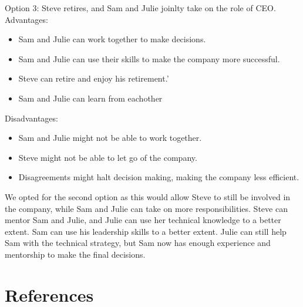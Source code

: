 \documentclass[a4paper,10pt]{article}
\begin{document}
Option 3: Steve retires, and Sam and Julie joinlty take on the role of CEO.\\

Advantages:\\
\begin{itemize}
    \item Sam and Julie can work together to make decisions.
    \item Sam and Julie can use their skills to make the company more successful.
    \item Steve can retire and enjoy his retirement.'
    \item Sam and Julie can learn from eachother
\end{itemize}

Disadvantages:\\
\begin{itemize}
    \item Sam and Julie might not be able to work together.
    \item Steve might not be able to let go of the company.
    \item Disagreements might halt decision making, making the company less efficient.
\end{itemize}

We opted for the second option as this would allow Steve to still be involved in the company, while Sam and Julie can take on more responsibilities. Steve can mentor Sam and Julie, and Julie can use her technical knowledge to a better extent. Sam can use his leadership skills to a better extent. Julie can still help Sam with the technical strategy, but Sam now has enough experience and mentorship to make the final decisions.

\section{References}
\end{document}
